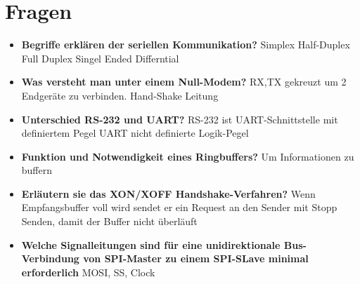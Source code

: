 \section{Fragen}
\begin{itemize}
	\item \textbf{Begriffe erklären der seriellen Kommunikation?}
	\subitem Simplex
	\subitem Half-Duplex
	\subitem Full Duplex
	\subitem Singel Ended
	\subitem Differntial
	
	\item \textbf{Was versteht man unter einem Null-Modem?}
	\subitem RX,TX gekreuzt um 2 Endgeräte zu verbinden. Hand-Shake Leitung
	
	\item \textbf{Unterschied RS-232 und UART?}
	\subitem RS-232 ist UART-Schnittstelle mit definiertem Pegel
	\subitem UART nicht definierte Logik-Pegel
	
	\item \textbf{Funktion und Notwendigkeit eines Ringbuffers?}
	\subitem Um Informationen zu buffern
	
	\item \textbf{Erläutern sie das XON/XOFF Handshake-Verfahren?}
	\subitem Wenn Empfangsbuffer voll wird sendet er ein Request an den Sender mit Stopp Senden, damit der Buffer nicht überläuft
	
	\item \textbf{Welche Signalleitungen sind für eine unidirektionale Bus-Verbindung von SPI-Master zu einem SPI-SLave minimal erforderlich}
	\subitem MOSI, SS, Clock
\end{itemize}





















